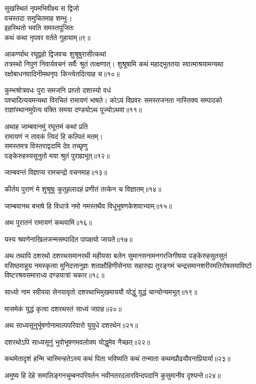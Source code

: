 \begin{flushleft}
सुखस्थितं नृपमभिवीक्ष्य स द्विजो\\
वचस्तदा समुचितमाह शम्भुः।\\
इहस्थितो भवति समस्तपूजितः\\
कथं कथा नृपवर वर्तते गुहायाम्॥९॥

आकर्ण्याथ रघूद्वहो द्विजवचः शुश्रूषुरासीत्कथां\\
तत्रस्थो निपुणं निवार्यवचनं सर्वैः श्रुतं तत्क्षणात्।
शुश्रूषामि कथं महाद्भुततया स्वात्माश्रयामन्यथा\\
रक्षोबाधनवादिनीमथनृपः किन्त्वेतदित्याह च॥१०॥

कुम्भश्रोत्रवधः पुरा समजनि प्राप्तो दशास्यो वधं\\
पश्चादित्ययमन्यथा विरचितं रामायणं भाषते।
कोऽयं विप्रवरः समस्तजनता नास्तिक्य सम्पादको\\
राज्ञांस्थानमुपेत्य वक्ति समया दण्ड्योऽथ पूज्योऽथवा॥११॥

अथाह जाम्बवानमुं रघूत्तमं कथां प्रति\\
रामायणं न तावकं त्विदं हि कल्पितं मतम्।\\
समस्तमत्र विस्तराद्वदामि देव तच्छृणु\\
पङ्केरुहस्यसूनुतो मया श्रुतं पुराह्यभूत्॥१२॥

जाम्बवन्तं विज्ञाप्य रामचन्द्रो वचनमाह॥१३॥


कीर्तय पुराणं मे शुश्रूषुः कुतूहलादहं प्रणीतं तत्केन च विज्ञातम्॥१४॥

जाम्बवानथ बभाषे हि विधात्रे नमो नमस्तथैव विधुभूषणकेशवाभ्याम्॥१५॥

अथ पुरातनं रामायणं कथयामि॥१६॥

यस्य श्रवणेनाखिलजन्मसम्पादित पापक्षयो जायते॥१७॥

अथ तथापि दशरथो दशरथसमानरथी महीयसा बलेन सुमानसनामनगरजिगीषया पङ्केरुहसुतसुतं वसिष्ठमाहूय नमस्कृत्वा मुनिदत्तानुज्ञः शताक्षौहिणीसेनया सहारुह्य तुरङ्गमं चन्द्रसमानशरीरमतिरोषसमाविष्टो विष्टरश्रवसमाराध्य दण्डयात्रां चकार॥१८॥

साध्यो नाम स्वीयया सेनयावृतो दशरथाभिमुखमाययौ योद्धुं युद्धं चान्योन्यमभूत्॥१९॥

मासमेकं युद्धं कृत्वा दशरथस्तं साध्यं जग्राह॥२०॥

अथ साध्यसूनुर्भूषणोनामाल्पपरिवारो युयुधे दशरथेन॥२१॥

दशरथोऽपि साध्यसूनुं भुवोभूषणमवलोक्य योद्धुमेव नैच्छत्॥२२॥

कथमेतादृशं हन्मि चास्मिन्हतेऽस्य कथं पिता भविष्यति कथं तन्माता कथमप्रौढयौवनाप्रियार्या॥२३॥

अमुष्य हि देहे समालिङ्गनचुम्बनपरिवर्तन नवीनतरदलारविन्दपदानि कुसुमानीव दृश्यन्ते॥२४॥


\end{flushleft}
